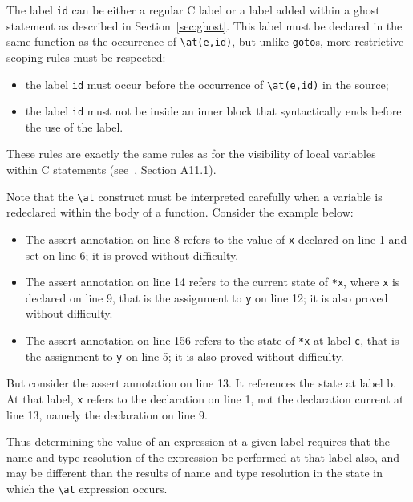 The label \lstinline|id| can be either a regular C label or a label added
within a ghost statement as described in Section~\ref{sec:ghost}. This
label must be declared in the same function as the occurrence of
\lstinline|\at(e,id)|, but unlike \lstinline|goto|s, more restrictive
scoping rules must be respected:
\begin{itemize}
\item the label \lstinline|id| must occur before the occurrence of
\lstinline|\at(e,id)|
  in the source;
\item the label \lstinline|id| must not be inside an inner block that syntactically ends before the use of the label.
\end{itemize}
These rules are exactly the same rules as for the visibility of local
variables within C statements (see~\cite{KR88}, Section A11.1).

Note that the \lstinline|\at| construct must be interpreted carefully when a variable is redeclared within the body of a function.
Consider the example below:
\begin{example}
\label{redeclaration}
\end{example}
\begin{itemize}
\item The assert annotation on line 8 refers to the value of \lstinline|x| declared on line 1 and set on line 6; it is proved without difficulty.
\item The assert annotation on line 14 refers to the current state of \lstinline|*x|, where \lstinline|x| is declared on line 9, that is the assignment to \lstinline|y| on line 12; it is also proved without difficulty.
\item The assert annotation on line 156 refers to the state of \lstinline|*x| at label \lstinline|c|, that is the assignment to \lstinline|y| on line 5; it is also proved without difficulty.
\end{itemize}
But consider the assert annotation on line 13. It references the state at label b. At that label, \lstinline|x| refers to the declaration on line 1, not the declaration current at line 13, namely the declaration on line 9. 

Thus determining the value of an expression at a given label requires that the name and type resolution of the expression be performed at that label also, and may be different than the results of name and type resolution in the state in which the \lstinline|\at| expression occurs.

